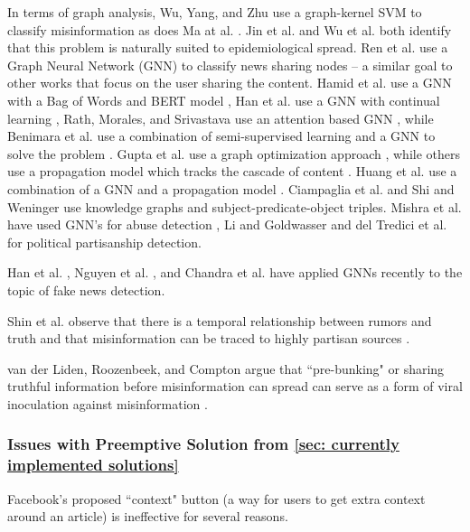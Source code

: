 \documentclass[preprint,review,12pt]{elsarticle}
\begin{document}
In terms of graph analysis, Wu, Yang, and Zhu \cite{wu2015false} use a graph-kernel SVM to classify misinformation as does Ma at al. \cite{ma2017detect}. Jin et al. \cite{jin2013epidemiological} and Wu et al. \cite{wu2016mining} both identify that this problem is naturally suited to epidemiological spread. Ren et al. use a Graph Neural Network (GNN) to classify news sharing nodes \cite{ren2020adversarial} -- a similar goal to other works that focus on the user sharing the content. Hamid et al. use a GNN with a Bag of Words and BERT model \cite{hamid2020fake}, Han et al. use a GNN with continual learning \cite{han2020graph}, Rath, Morales, and Srivastava use an attention based GNN \cite{rath2021scarlet}, while Benimara et al. use a combination of semi-supervised learning and a GNN to solve the problem \cite{benamira2019semi}.  Gupta et al. use a graph optimization approach \cite{gupta2012evaluating}, while others use a propagation model which tracks the cascade of content \cite{jin2016news,jin2014news,zhou2018fake,kashima2003marginalized}. Huang et al. use a combination of a GNN and a propagation model \cite{huang2019deep}. Ciampaglia et al. \cite{ciampaglia2015computational} and Shi and Weninger \cite{shi2016discriminative} use knowledge graphs and subject-predicate-object triples. Mishra et al. have used GNN's for abuse detection \cite{mishra2019abusive}, Li and Goldwasser \cite{li2019encoding} and del Tredici et al. \cite{del2019you} for political partisanship detection. 


Han et al. \cite{han2020graph}, Nguyen et al. \cite{nguyen2020fang}, and Chandra et al. \cite{chandra2020graph} have applied GNNs recently to the topic of fake news detection. 

 Shin et al. observe that there is a temporal relationship between rumors and truth and that misinformation can be traced to highly partisan sources \cite{shin2018diffusion}.
 
 
 van der Liden, Roozenbeek, and Compton argue that ``pre-bunking" or sharing truthful information before misinformation can spread can serve as a form of viral inoculation against misinformation \cite{van2020inoculating}.
 
 \subsubsection{Issues with Preemptive Solution from \ref{sec: currently implemented solutions}}
 Facebook's proposed ``context" button (a way for users to get extra context around an article) is ineffective for several reasons. 
 
\end{document}
